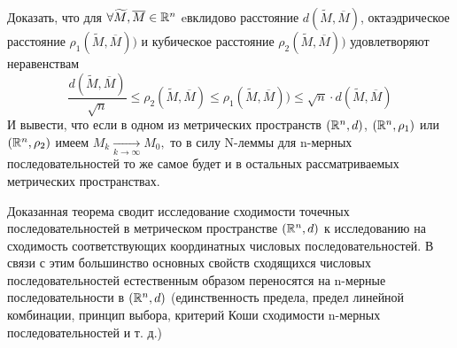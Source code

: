 \documentclass[../../main.tex]{subfiles}
\begin{document}
	\begin{exc}
		Доказать, что для $\forall \widetilde M, \overline{M} \in \mathbb{R}^n$ eвклидово расстояние $d(\widetilde M, \overline{M})$, октаэдрическое расстояние $\rho_1(\widetilde M, \overline{M}))$ и кубическое расстояние $\rho_2(\widetilde M, \overline{M}))$ удовлетворяют неравенствам
		\[
		\frac{d(\widetilde M, \overline{M})}{\sqrt{n}} \leqslant \rho_2(\widetilde M, \overline{M}) \leqslant \rho_1(\widetilde M, \overline{M})) \leqslant \sqrt{n}\cdot d(\widetilde M, \overline{M})
		\]
 		И вывести, что если в одном из метрических пространств $(\mathbb{R}^n, d)$, $(\mathbb{R}^n, \rho_1)$ или $(\mathbb{R}^n, \rho_2)$ имеем $M_k \underset{k\rightarrow\infty}{\longrightarrow}  M_0,$ то в силу N-леммы для n-мерных последовательностей то же самое будет и в остальных рассматриваемых метрических пространствах.
	\end{exc}
	
	\begin{rem}
		Доказанная теорема сводит исследование сходимости точечных последовательностей в метрическом пространстве $(\mathbb{R}^n, d)$ к исследованию на сходимость соответствующих координатных числовых последовательностей.
		В связи с этим большинство основных свойств сходящихся числовых последовательностей естественным образом переносятся на n-мерные последовательности в $(\mathbb{R}^n, d)$
		(единственность предела, предел линейной комбинации, принцип выбора, критерий Коши сходимости n-мерных последовательностей и т. д.)
	\end{rem}
	
\end{document}
